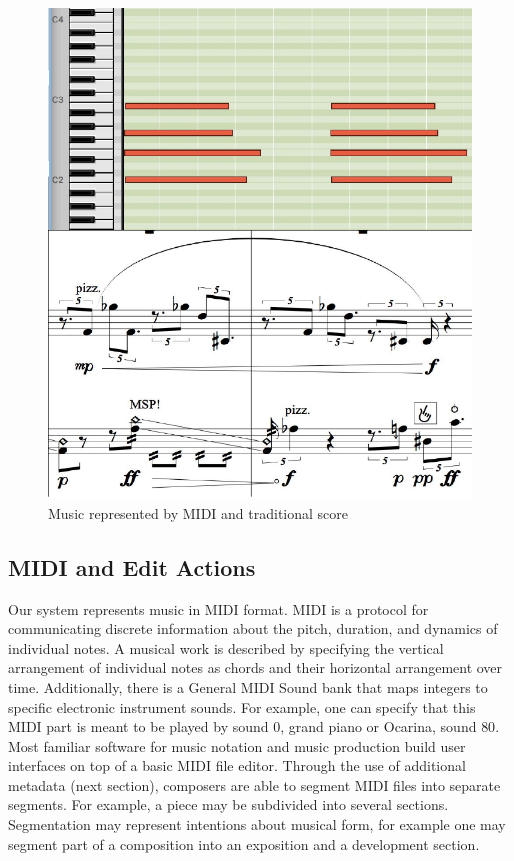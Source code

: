 \documentclass[final,authoryear,5p,times,twocolumn]{elsarticle}
\begin{document}
\begin{figure}
	\centering
	\includegraphics[scale=0.5]{midi.pdf}
	\caption{Music represented by MIDI and traditional score}
	\label{fig:midi}
\end{figure}

\subsection{MIDI and Edit Actions}

Our system represents music in MIDI format. MIDI is a protocol for communicating discrete information about the pitch, duration, and dynamics of individual notes. A musical work is described by specifying the vertical arrangement of individual notes as chords and their horizontal arrangement over time. Additionally, there is a General MIDI Sound bank that maps integers to specific electronic instrument sounds. For example, one can specify that this MIDI part is meant to be played by sound $0$, grand piano or Ocarina, sound $80$. Most familiar software for music notation and music production build user interfaces on top of a basic MIDI file editor. Through the use of additional metadata (next section), composers are able to segment MIDI files into separate segments. For example, a piece may be subdivided into several sections. Segmentation may represent intentions about musical form, for example one may segment part of a composition into an exposition and a development section. 
\end{document}
